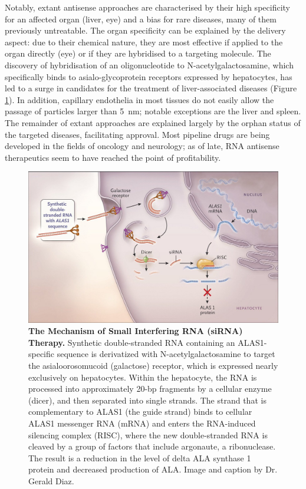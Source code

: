 Notably, extant antisense approaches are characterised by their high specificity for an affected organ (liver, eye) and a bias for rare diseases, many of them previously untreatable. The organ specificity can be explained by the delivery aspect: due to their chemical nature, they are most effective if applied to the organ directly (eye) or if they are hybridised to a targeting molecule. The discovery of hybridisation of an oligonucleotide to N-acetylgalactosamine, which specifically binds to asialo-glycoprotein receptors expressed by hepatocytes, has led to a surge in candidates for the treatment of liver-associated diseases (Figure \ref{fig:pathophys-porphyria}).\cite{Wang2020} In addition, capillary endothelia in most tissues do not easily allow the passage of particles larger than \SI{5}{\nano\metre}; notable exceptions are the liver and spleen.\cite{Gullotti2009} The remainder of extant approaches are explained largely by the orphan status of the targeted diseases, facilitating approval. Most pipeline drugs are being developed in the fields of oncology and neurology; as of late, RNA antisense therapeutics seem to have reached the point of profitability.\cite{Wang2020} 

\begin{figure}[ht]
\includegraphics[width=\textwidth]{figures/pathophys-porphyria-therapy-sirna-nejm-original}
\caption[The Mechanism of Small Interfering RNA (siRNA) Therapy.]{\textbf{The Mechanism of Small Interfering RNA (siRNA) Therapy.} Synthetic double-stranded RNA containing an ALAS1-specific sequence is derivatized with N-acetylgalactosamine to target the asialoorosomucoid (galactose) receptor, which is expressed nearly exclusively on hepatocytes. Within the hepatocyte, the RNA is processed into approximately 20-bp fragments by a cellular enzyme (dicer), and then separated into single strands. The strand that is complementary to ALAS1 (the guide strand) binds to cellular ALAS1 messenger RNA (mRNA) and enters the RNA-induced silencing complex (RISC), where the new double-stranded RNA is cleaved by a group of factors that include argonaute, a ribonuclease. The result is a reduction in the level of delta ALA synthase 1 protein and decreased production of ALA. Image and caption by Dr. Gerald Diaz.\cite{Diaz2018}
\label{fig:pathophys-porphyria}}
\end{figure}

